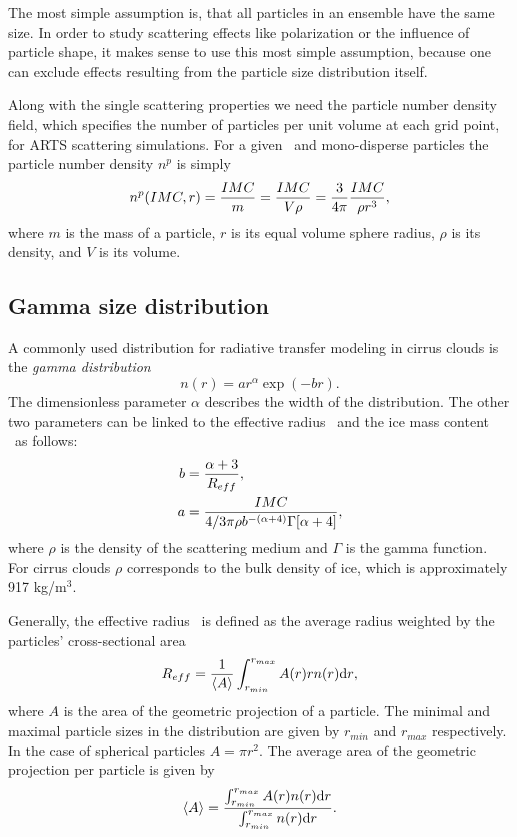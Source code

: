 The most simple assumption is, that all particles in an ensemble have
the same size.  In order to study scattering effects like polarization
or the influence of particle shape, it makes sense to use this most
simple assumption, because one can exclude effects resulting from the
particle size distribution itself.  

Along with the single scattering properties we need the particle
number density field, which specifies the number of particles per
unit volume at each grid point, for ARTS scattering simulations.  For
a given \imc\ and mono-disperse particles the particle number density
$n^p$ is simply
\begin{equation}
\label{eq:pnd_mono}
  n^p (IMC, r) =\frac{IMC}{m} = \frac{IMC}{V\rho}
    =\frac{3}{4\pi}\frac{IMC}{\rho r^3},  
\end{equation}
where $m$ is the mass of a particle, $r$ is its equal volume sphere
radius, $\rho$ is its density, and $V$ is its volume.
     
\subsection{Gamma size distribution}
\label{sec:clouds:gamma_distr}

A commonly used distribution for radiative transfer modeling in cirrus
clouds is the \emph{gamma distribution}
\begin{equation}
  n(r) = a  r^\alpha \exp(-br).
\label{eq:gamma_distr}
\end{equation}
The dimensionless parameter $\alpha$ describes the width of the
distribution. The other two parameters can be linked to the effective
radius \Reff\ and the ice mass content \imc\ as follows:
\begin{eqnarray}
  b &= \frac{\alpha+3}{R_{eff}},\\
  a &= \frac{IMC}{4/3\pi\rho b^{-(\alpha+4)}\Gamma[\alpha+4]},
\label{eq:gamma_coeff}
\end{eqnarray}
where $\rho$ is the density of the scattering medium and $\Gamma$ is
the gamma function. For cirrus clouds $\rho$ corresponds to the bulk
density of ice, which is approximately 917 kg/m$^3$.

Generally, the effective radius \Reff\ is defined as the average
radius weighted by the particles' cross-sectional area
\begin{equation}
  \label{eq:Reff}
  R_{eff}= \frac{1}{\left\langle A \right\rangle} \int_{r_{min}}^{r_{max}} {A(r) r n(r) \mathrm{d} r},
\end{equation}
where $A$ is the area of the geometric projection of a particle. The
minimal and maximal particle sizes in the distribution are given by
$r_{min}$ and $r_{max}$ respectively. In the case of spherical
particles $A = \pi r^2$. The average area of the geometric projection
per particle  is given by
\begin{equation}
  \left\langle A \right\rangle = \frac{\int_{r_{min}}^{r_{max}} {A(r) n(r) \mathrm{d} r}}{\int_{r_{min}}^{r_{max}} {n(r) \mathrm{d} r}}.
\end{equation}

